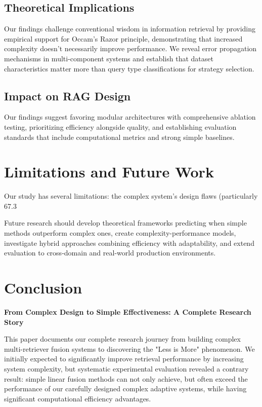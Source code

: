 \documentclass[letterpaper]{article} %
\begin{document}
\subsection{Theoretical Implications}

Our findings challenge conventional wisdom in information retrieval by providing empirical support for Occam's Razor principle, demonstrating that increased complexity doesn't necessarily improve performance. We reveal error propagation mechanisms in multi-component systems and establish that dataset characteristics matter more than query type classifications for strategy selection.

\subsection{Impact on RAG Design}

Our findings suggest favoring modular architectures with comprehensive ablation testing, prioritizing efficiency alongside quality, and establishing evaluation standards that include computational metrics and strong simple baselines.


\section{Limitations and Future Work}

Our study has several limitations: the complex system's design flaws (particularly 67.3%

Future research should develop theoretical frameworks predicting when simple methods outperform complex ones, create complexity-performance models, investigate hybrid approaches combining efficiency with adaptability, and extend evaluation to cross-domain and real-world production environments.

\section{Conclusion}

\textbf{From Complex Design to Simple Effectiveness: A Complete Research Story}

This paper documents our complete research journey from building complex multi-retriever fusion systems to discovering the "Less is More" phenomenon. We initially expected to significantly improve retrieval performance by increasing system complexity, but systematic experimental evaluation revealed a contrary result: simple linear fusion methods can not only achieve, but often exceed the performance of our carefully designed complex adaptive systems, while having significant computational efficiency advantages.
\end{document}
